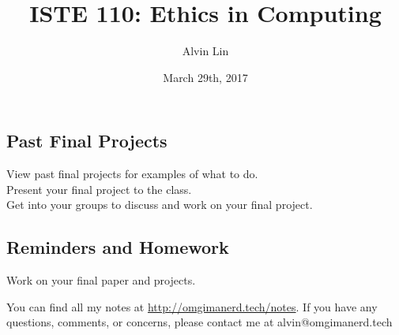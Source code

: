 \documentclass{article}
\title{ISTE 110: Ethics in Computing}
\author{Alvin Lin}
\date{March 29th, 2017}
\begin{document}
\maketitle

\subsection*{Past Final Projects}
View past final projects for examples of what to do. \\
Present your final project to the class. \\
Get into your groups to discuss and work on your final project.

\subsection*{Reminders and Homework}
Work on your final paper and projects.

\begin{center}
  You can find all my notes at \url{http://omgimanerd.tech/notes}. If you have
  any questions, comments, or concerns, please contact me at
  alvin@omgimanerd.tech
\end{center}
\end{document}
